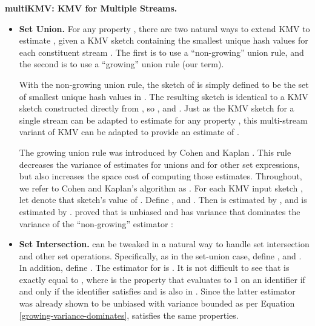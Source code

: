 \documentclass{article}
\newcommand{\IKMV}{multiKMV}
\begin{document}
\medskip \noindent \textbf{\IKMV: KMV for Multiple Streams.}\label{subsubBKMV2} \label{sec:IKMV}
 \begin{itemize}
 \item \textbf{Set Union.} 
For any property , there are two natural ways to extend KMV to estimate , 
given a KMV sketch  containing the  smallest unique hash values for each constituent stream . 
The first is to use a ``non-growing'' union rule, and the second is to use a ``growing'' union rule (our term). 

With the non-growing union rule, the sketch 
of  is simply defined to be the set of  smallest unique hash values in .
The resulting sketch is identical to a KMV sketch constructed directly from , so , and
. 
Just as the KMV sketch for a single stream  can be adapted to estimate  for any property , 
this multi-stream variant of KMV can be adapted to provide an estimate  of
.

The growing union rule
was introduced by Cohen and Kaplan \cite{cohen2009leveraging}.
This rule decreases the variance of estimates
for unions and for other set expressions, but also increases the space
cost of computing those estimates. Throughout, we refer to Cohen and Kaplan's algorithm as .
\label{subsubIKMV}
For each KMV input sketch , let  denote that sketch's value of . 
Define , and .
Then  is estimated by , 
and   is estimated by .
\cite{cohen2009leveraging} proved that  is unbiased and has
variance that 
dominates the variance of the ``non-growing'' estimator :



\item \textbf{Set Intersection.}  can be tweaked in a natural way to handle set intersection and other set operations.
Specifically, as in the set-union case, define , and . In addition, define .
The estimator for  is .
It is not difficult to see that  is exactly equal to , 
where  is the property that evaluates to 1 on an identifier if and only if
the identifier satisfies  and is also in . 
Since the latter estimator was already shown to be unbiased with variance bounded as per Equation \eqref{growing-variance-dominates},
 satisfies the same properties. 
\end{itemize}
\end{document}
